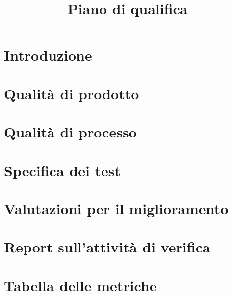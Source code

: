 \documentclass{article}
\title{Piano di qualifica}
\begin{document}


\newpage
\section{Introduzione}%
\label{sec:introduzione}



\newpage
\section{Qualità di prodotto}%
\label{sec:qualita_di_prodotto}



\newpage
\section{Qualità di processo}%
\label{sec:qualita_di_processo}



\newpage
\appendix
\section{Specifica dei test}%
\label{sub:specifica_test}



\newpage
\section{Valutazioni per il miglioramento}%
\label{sec:valutazioni_miglioramento}


\newpage
\section{Report sull'attività di verifica}%
\label{sec:report_verifica}



\newpage
\section{Tabella delle metriche}%
\label{sec:tabella_metriche}


\end{document}
